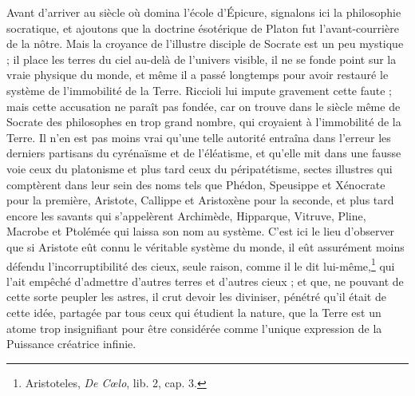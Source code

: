 \documentclass[a4paper, 11pt, oneside, landscape]{article}
\begin{document}
Avant d'arriver au siècle où domina l'école d'Épicure, signalons ici la philosophie socratique, et ajoutons que la doctrine ésotérique de Platon fut l'avant-courrière de la nôtre. Mais la croyance de l'illustre disciple de Socrate est un peu mystique ; il place les terres du ciel au-delà de l'univers visible, il ne se fonde point sur la vraie physique du monde, et même il a passé longtemps pour avoir restauré le système de l'immobilité de la Terre. Riccioli lui impute gravement cette faute ; mais cette accusation ne paraît pas fondée, car on trouve dans le siècle même de Socrate des philosophes en trop grand nombre, qui croyaient à l'immobilité de la Terre. Il n'en est pas moins vrai qu'une telle autorité entraîna dans l'erreur les derniers partisans du cyrénaïsme et de l'éléatisme, et qu'elle mit dans une fausse voie ceux du platonisme et plus tard ceux du péripatétisme, sectes illustres qui comptèrent dans leur sein des noms tels que Phédon, Speusippe et Xénocrate pour la première, Aristote, Callippe et Aristoxène pour la seconde, et plus tard encore les savants qui s'appelèrent Archimède, Hipparque, Vitruve, Pline, Macrobe et Ptolémée qui laissa son nom au système. C'est ici le lieu d'observer que si Aristote eût connu le véritable système du monde, il eût assurément moins défendu l'incorruptibilité des cieux, seule raison, comme il le dit lui-même,\footnote{Aristoteles, \emph{De Cœlo}, lib. 2, cap. 3.} qui l'ait empêché d'admettre d'autres terres et d'autres cieux ; et que, ne pouvant de cette sorte peupler les astres, il crut devoir les diviniser, pénétré qu'il était de cette idée, partagée par tous ceux qui étudient la nature, que la Terre est un atome trop insignifiant pour être considérée comme l'unique expression de la Puissance créatrice infinie.
\end{document}
